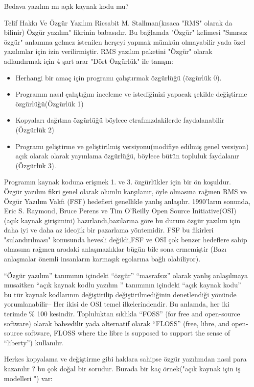 \documentclass[10pt,a5paper]{book}
\begin{document}
\begin{section}{Bedava yazılım mı açık kaynak kodu mu?}
\begin{subsection}{Telif Hakkı Ve Özgür Yazılım}
Ricsabit M. Stallman(kısaca "RMS" olarak da bilinir) Özgür yazılım" fikrinin babasıdır. Bu bağlamda "Özgür" kelimesi "Sınırsız özgür" anlamına gelmez istenilen herşeyi yapmak mümkün olmayabilir yada özel yazılımlar için izin verilirmiştir. RMS yazılım paketini "Özgür" olarak adlandırmak için 4 şart arar  "Dört Özgürlük" ile tanışın:

\begin{itemize}
 \item Herhangi bir amaç için programı çalıştırmak  özgürlüğü (özgürlük 0).
 \item Programın nasıl çalıştığını inceleme ve istediğinizi yapacak şekilde değiştirme özgürlüğü(Özgürlük 1)
 \item Kopyaları dağıtma özgürlüğü böylece etrafınızdakilerde faydalanabilir (Özgürlük 2)
 \item Programı geliştirme ve geliştirilmiş versiyonu(modifiye edilmiş genel versiyon) açık olarak olarak yayınlama özgürlüğü, böylece bütün topluluk
faydalanır (Özgürlük 3).
 \end{itemize}

Programın kaynak koduna erişmek 1. ve 3. özgürlükler için bir ön koşuldur. Özgür yazılım fikri genel olarak olumlu karşılanır, öyle olmasına rağmen RMS ve Özgür Yazılım Vakfı (FSF) hedefleri genellikle yanlış anlaşılır. 1990'ların sonunda, Eric S. Raymond, Bruce Perens ve Tim O'Reilly Open Source Initiative(OSI)(açık kaynak girişimini) hazırlandı,bazılarına göre bu durum özgür yazılım için daha iyi ve daha az ideojik bir pazarlama yöntemidir. FSF bu fikirleri "sulandırılması" konusunda hevesli değildi,FSF ve OSI çok benzer hedeflere sahip olmasına rağmen aradaki anlaşmazlıklar bügün bile sona ermemiştir (Bazı anlaşmalar önemli insanların karmaşık egolarına bağlı olabiliyor).

“Özgür yazılım” tanımının içindeki “özgür” “masrafsız” olarak yanlış anlaşılmaya musaitken “açık kaynak kodlu yazılım ” tanımının içindeki “açık kaynak kodu” bu tür kaynak kodlarının değiştirilip değiştirilmediğinin denetlendiği yönünde yorumlanabilir-- Her ikisi de OSI temel ilkelerindendir. Bu anlamda, her iki terimde \% 100 kesindir. Topluluktan sıklıkla “FOSS” (for free and open-source software) olarak bahsedilir yada alternatif olarak “FLOSS” (free, libre, and open-source software, FLOSS where the libre is supposed to support the sense of “liberty”) kullanılır.

Herkes kopyalama ve değiştirme gibi haklara sahipse özgür yazılımdan nasıl para kazanılır ? bu çok doğal bir sorudur. Burada bir kaç örnek("açık kaynak için iş modelleri ") var:


\end{subsection}
\end{section}
\end{document}
